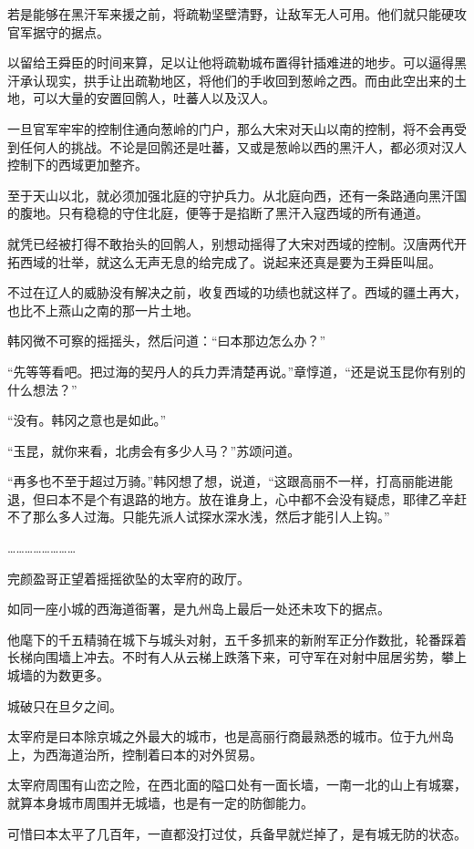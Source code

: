 若是能够在黑汗军来援之前，将疏勒坚壁清野，让敌军无人可用。他们就只能硬攻官军据守的据点。

以留给王舜臣的时间来算，足以让他将疏勒城布置得针插难进的地步。可以逼得黑汗承认现实，拱手让出疏勒地区，将他们的手收回到葱岭之西。而由此空出来的土地，可以大量的安置回鹘人，吐蕃人以及汉人。

一旦官军牢牢的控制住通向葱岭的门户，那么大宋对天山以南的控制，将不会再受到任何人的挑战。不论是回鹘还是吐蕃，又或是葱岭以西的黑汗人，都必须对汉人控制下的西域更加整齐。

至于天山以北，就必须加强北庭的守护兵力。从北庭向西，还有一条路通向黑汗国的腹地。只有稳稳的守住北庭，便等于是掐断了黑汗入寇西域的所有通道。

就凭已经被打得不敢抬头的回鹘人，别想动摇得了大宋对西域的控制。汉唐两代开拓西域的壮举，就这么无声无息的给完成了。说起来还真是要为王舜臣叫屈。

不过在辽人的威胁没有解决之前，收复西域的功绩也就这样了。西域的疆土再大，也比不上燕山之南的那一片土地。

韩冈微不可察的摇摇头，然后问道：“曰本那边怎么办？”

“先等等看吧。把过海的契丹人的兵力弄清楚再说。”章惇道，“还是说玉昆你有别的什么想法？”

“没有。韩冈之意也是如此。”

“玉昆，就你来看，北虏会有多少人马？”苏颂问道。

“再多也不至于超过万骑。”韩冈想了想，说道，“这跟高丽不一样，打高丽能进能退，但曰本不是个有退路的地方。放在谁身上，心中都不会没有疑虑，耶律乙辛赶不了那么多人过海。只能先派人试探水深水浅，然后才能引人上钩。”

……………………

完颜盈哥正望着摇摇欲坠的太宰府的政厅。

如同一座小城的西海道衙署，是九州岛上最后一处还未攻下的据点。

他麾下的千五精骑在城下与城头对射，五千多抓来的新附军正分作数批，轮番踩着长梯向围墙上冲去。不时有人从云梯上跌落下来，可守军在对射中屈居劣势，攀上城墙的为数更多。

城破只在旦夕之间。

太宰府是曰本除京城之外最大的城市，也是高丽行商最熟悉的城市。位于九州岛上，为西海道治所，控制着曰本的对外贸易。

太宰府周围有山峦之险，在西北面的隘口处有一面长墙，一南一北的山上有城寨，就算本身城市周围并无城墙，也是有一定的防御能力。

可惜曰本太平了几百年，一直都没打过仗，兵备早就烂掉了，是有城无防的状态。

